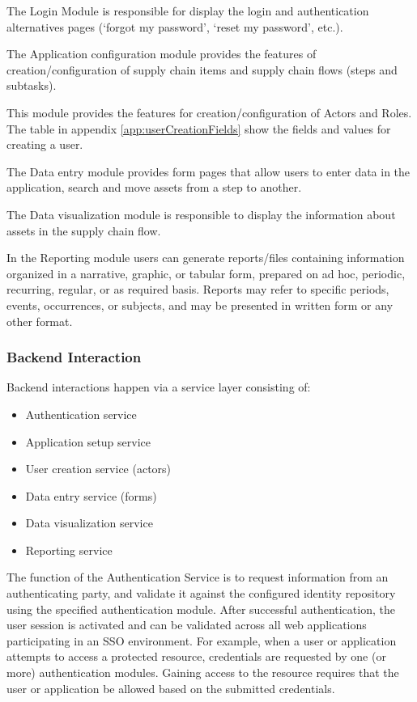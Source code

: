 The Login Module is responsible for display the login and authentication alternatives pages (‘forgot my password’, ‘reset my password’, etc.).

The Application configuration module provides the features of creation/configuration of supply chain items and supply chain flows (steps and subtasks).

This module provides the features for creation/configuration of Actors and Roles. The table in appendix \ref{app:userCreationFields} show the fields and values for creating a user.

The Data entry module provides form pages that allow users to enter data in the application, search and move assets from a step to another.

The Data visualization module is responsible to display the information about assets in the supply chain flow. 

In the Reporting module users can generate reports/files containing information organized in a narrative, graphic, or tabular form, prepared on ad hoc, periodic, recurring, regular, or as required basis. Reports may refer to specific periods, events, occurrences, or subjects, and may be presented in written form or any other format.

\subsubsection{Backend Interaction}\label{sec:BackendInteraction}
Backend interactions happen via a service layer consisting of:

\begin{itemize}
\item Authentication service
\item Application setup service
\item User creation service (actors)
\item Data entry service (forms)
\item Data visualization service
\item Reporting service
\end{itemize}

The function of the Authentication Service is to request information from an authenticating party, and validate it against the configured identity repository using the specified authentication module. After successful authentication, the user session is activated and can be validated across all web applications participating in an SSO environment. For example, when a user or application attempts to access a protected resource, credentials are requested by one (or more) authentication modules. Gaining access to the resource requires that the user or application be allowed based on the submitted credentials.

